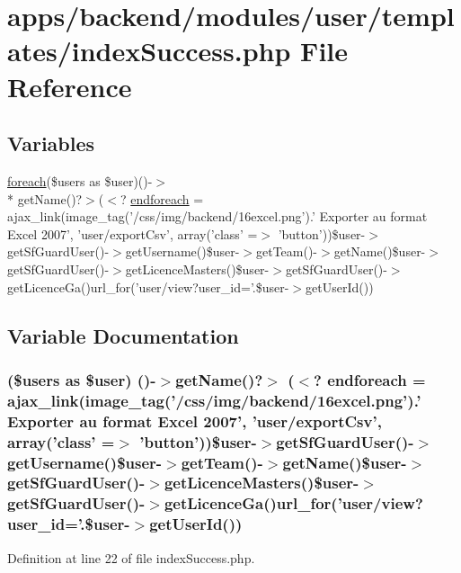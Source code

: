 \hypertarget{backend_2modules_2user_2templates_2index_success_8php}{\section{apps/backend/modules/user/templates/index\-Success.php File Reference}
\label{backend_2modules_2user_2templates_2index_success_8php}
}
\subsection*{Variables}
\begin{DoxyCompactItemize}
\item 
\hyperlink{presse_2modules_2news_2templates_2index_success_8php_abc56db52b2e9a59bcd5c9e45ac5cb332}{foreach}(\$users as \$user)()-\/$>$\\*
get\-Name()?$>$($<$? \hyperlink{backend_2modules_2user_2templates_2index_success_8php_aa7f84e21e6316dd1a34de15d528bfba2}{endforeach} = ajax\-\_\-link(image\-\_\-tag('/css/img/backend/16excel.\-png').' Exporter au format Excel 2007', 'user/export\-Csv', array('class' =$>$ 'button'))\$user-\/$>$get\-Sf\-Guard\-User()-\/$>$get\-Username()\$user-\/$>$get\-Team()-\/$>$get\-Name()\$user-\/$>$get\-Sf\-Guard\-User()-\/$>$get\-Licence\-Masters()\$user-\/$>$get\-Sf\-Guard\-User()-\/$>$get\-Licence\-Ga()url\-\_\-for('user/view?user\-\_\-id='.\$user-\/$>$get\-User\-Id())
\end{DoxyCompactItemize}


\subsection{Variable Documentation}
\hypertarget{backend_2modules_2user_2templates_2index_success_8php_aa7f84e21e6316dd1a34de15d528bfba2}{
\subsubsection[{endforeach}]{ (\$users as \$user) ()-\/$>$get\-Name()?$>$ ($<$? endforeach = ajax\-\_\-link(image\-\_\-tag('/css/img/backend/16excel.\-png').' Exporter au format Excel 2007', 'user/export\-Csv', array('class' =$>$ 'button'))\$user-\/$>$get\-Sf\-Guard\-User()-\/$>$get\-Username()\$user-\/$>$get\-Team()-\/$>$get\-Name()\$user-\/$>$get\-Sf\-Guard\-User()-\/$>$get\-Licence\-Masters()\$user-\/$>$get\-Sf\-Guard\-User()-\/$>$get\-Licence\-Ga()url\-\_\-for('user/view?user\-\_\-id='.\$user-\/$>$get\-User\-Id())}}\label{backend_2modules_2user_2templates_2index_success_8php_aa7f84e21e6316dd1a34de15d528bfba2}


Definition at line 22 of file index\-Success.\-php.

